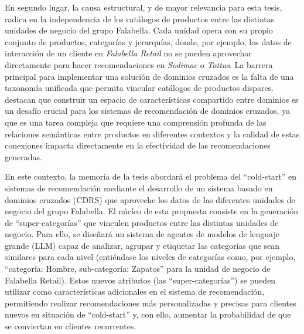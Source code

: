 En segundo lugar, la causa estructural, y de mayor relevancia para esta tesis, radica en la independencia de los catálogos de productos entre las distintas unidades de negocio del grupo Falabella. Cada unidad opera con su propio conjunto de productos, categorías y jerarquías, donde, por ejemplo, los datos de interacción de un cliente en \textit{Falabella Retail} no se pueden aprovechar directamente para hacer recomendaciones en \textit{Sodimac} o \textit{Tottus}. La barrera principal para implementar una solución de dominios cruzados es la falta de una taxonomía unificada que permita vincular catálogos de productos dispares. \cite{9732900} destacan que construir un espacio de características compartido entre dominios es un desafío crucial para los sistemas de recomendación de dominios cruzados, ya que es una tarea compleja que requiere una comprensión profunda de las relaciones semánticas entre productos en diferentes contextos y la calidad de estas conexiones impacta directamente en la efectividad de las recomendaciones generadas.

En este contexto, la memoria de la tesis abordará el problema del \enquote{cold-start} en sistemas de recomendación mediante el desarrollo de un sistema basado en dominios cruzados (CDRS) que aproveche los datos de las diferentes unidades de negocio del grupo Falabella. El núcleo de esta propuesta consiste en la generación de \enquote{super-categorías} que vinculen productos entre las distintas unidades de negocio. Para ello, se diseñará un sistema de agentes de modelos de lenguaje grande (LLM) capaz de analizar, agrupar y etiquetar las categorías que sean similares para cada nivel (entiéndase los niveles de categorías como, por ejemplo, \enquote{categoría: Hombre, sub-categoría: Zapatos} para la unidad de negocio de Falabella Retail). Estos nuevos atributos (las \enquote{super-categorías}) se pueden utilizar como características adicionales en el sistema de recomendación, permitiendo realizar recomendaciones más personalizadas y precisas para clientes nuevos en situación de \enquote{cold-start} y, con ello, aumentar la probabilidad de que se conviertan en clientes recurrentes.